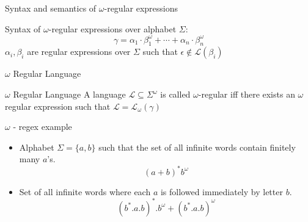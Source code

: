 \documentclass[14pts]{beamer}
\begin{document}
  {
    \begin{frame}{Syntax and semantics of $\omega$-regular expressions}
      \begin{definition}
        Syntax of $\omega$-regular expressions over alphabet $\Sigma$:
        \[\gamma  =  \alpha_1\cdot\beta_1^{\omega}+ \cdots + \alpha_n\cdot\beta_n^{\omega} \]
        $\alpha_i, \beta_i$ are regular expressions over $\Sigma$ such that $\epsilon \notin \mathcal{L}(\beta_i)$
      \end{definition}
    \end{frame}
    \begin{frame}{$\omega$ Regular Language}
      \begin{block}{$\omega$ Regular Language}
        A language $\mathcal{L} \subseteq \Sigma^{\omega}$ is called $\omega$-regular iff there exists an $\omega$ regular expression
        such that $\mathcal{L} = \mathcal{L}_{\omega}(\gamma)$
      \end{block}
    \end{frame}}
  \begin{frame}{$\omega$ - regex example}
    \begin{itemize}
      \item<1> Alphabet $\Sigma = \{a, b\}$ such that the set of all infinite words contain finitely
      many $a$'s.
      \[(a + b)^*b^{\omega}\]
      \item<2> Set of all infinite words where each $a$ is followed immediately by letter $b$.
      \[(b^*.a.b)^*.b^{\omega} + (b^*.a.b)^{\omega}\]
    \end{itemize}
  \end{frame}
\end{document}
